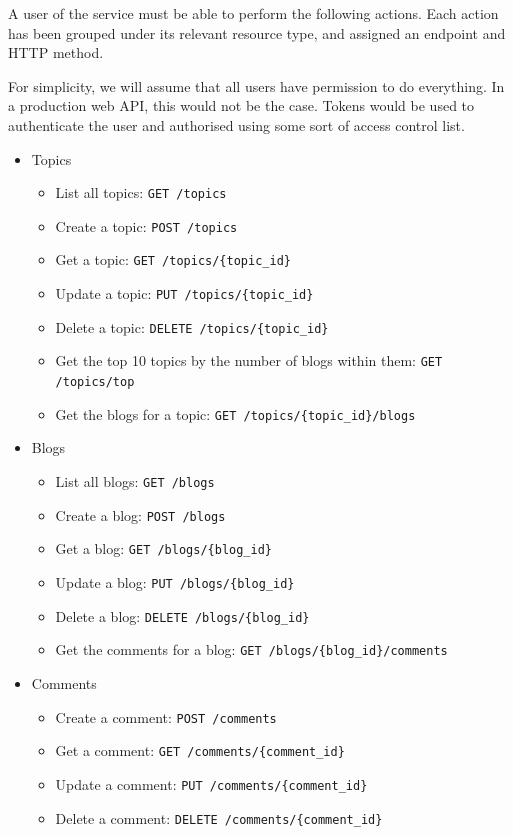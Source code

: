 \documentclass[]{full}
\theoremstyle{definition}
\begin{document}
A user of the service must be able to perform the following actions. Each action has been grouped under its relevant resource type, and assigned an endpoint and HTTP method.

For simplicity, we will assume that all users have permission to do everything. In a production web API, this would not be the case. Tokens would be used to authenticate the user and authorised using some sort of access control list.

\begin{itemize}
    \item Topics
    \begin{itemize}
        \item List all topics: \verb|GET /topics|
        \item Create a topic: \verb|POST /topics|
        \item Get a topic: \verb|GET /topics/{topic_id}|
        \item Update a topic: \verb|PUT /topics/{topic_id}|
        \item Delete a topic: \verb|DELETE /topics/{topic_id}|
        \item Get the top 10 topics by the number of blogs within them: \verb|GET /topics/top|
        \item Get the blogs for a topic: \verb|GET /topics/{topic_id}/blogs|
    \end{itemize}
    \item Blogs
    \begin{itemize}
        \item List all blogs: \verb|GET /blogs|
        \item Create a blog: \verb|POST /blogs|
        \item Get a blog: \verb|GET /blogs/{blog_id}|
        \item Update a blog: \verb|PUT /blogs/{blog_id}|
        \item Delete a blog: \verb|DELETE /blogs/{blog_id}|
        \item Get the comments for a blog: \verb|GET /blogs/{blog_id}/comments|
    \end{itemize}
    \item Comments
    \begin{itemize}
        \item Create a comment: \verb|POST /comments|
        \item Get a comment: \verb|GET /comments/{comment_id}|
        \item Update a comment: \verb|PUT /comments/{comment_id}|
        \item Delete a comment: \verb|DELETE /comments/{comment_id}|
    \end{itemize}
\end{itemize}
\end{document}

